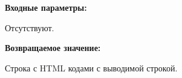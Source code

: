 \textbf{Входные параметры:}

Отсутствуют.

\textbf{Возвращаемое значение:}

Строка с HTML кодами с выводимой строкой.